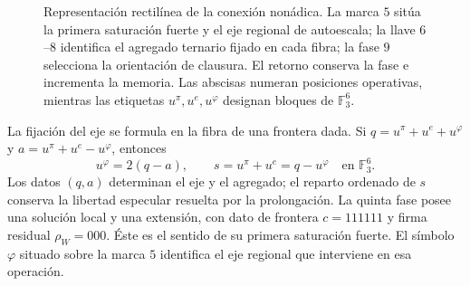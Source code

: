 \begin{figure}[H]
\centering
{}
\caption{Representación rectilínea de la conexión nonádica. La marca
\(5\) sitúa la primera saturación fuerte y el eje regional de
autoescala; la llave \(6\)--\(8\) identifica el agregado ternario
fijado en cada fibra; la fase \(9\) selecciona la orientación de
clausura. El retorno conserva la fase e incrementa la memoria. Las
abscisas numeran posiciones operativas, mientras las etiquetas
\(u^\pi,u^e,u^\varphi\) designan bloques de \(\mathbb F_3^6\).}
\label{x_reciprocidad:mono-recta:figura}
\end{figure}



La fijación del eje se formula en la fibra de una frontera dada. Si
\(q=u^\pi+u^e+u^\varphi\) y
\(a=u^\pi+u^e-u^\varphi\), entonces
\[
 u^\varphi=2(q-a),\qquad s=u^\pi+u^e=q-u^\varphi
 \quad\text{en }\mathbb F_3^6.
\]
Los datos \((q,a)\) determinan el eje y el agregado; el reparto ordenado
de \(s\) conserva la libertad especular resuelta por la prolongación.
La quinta fase posee una solución local y una extensión, con dato
de frontera \(c=111111\) y firma residual \(\rho_W=000\). Éste es el
sentido de su primera saturación fuerte. El símbolo \(\varphi\)
situado sobre la marca \(5\) identifica el eje regional que interviene
en esa operación.

